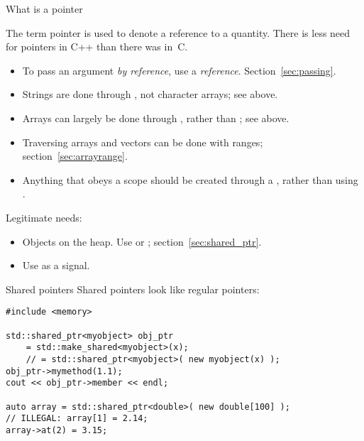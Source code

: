 
 {What is a pointer}

The term pointer is used to denote a reference to a quantity.
There is less need for pointers in C++ than there was in~C.

\begin{itemize}
\item To pass an argument
  \emph{by reference},
  use a \emph{reference}.
  Section~\ref{sec:passing}.
\item Strings are done through , not character arrays;
  see above.
\item Arrays can largely be done through , rather than
  ; see above.
\item Traversing arrays and vectors can be done with ranges;
  section~\ref{sec:arrayrange}.
\item Anything that obeys a scope should be created through a
  , rather than using .
\end{itemize}

Legitimate needs:
\begin{itemize}
\item Objects on the heap. Use  or
  ; section~\ref{sec:shared_ptr}.
\item Use  as a signal.
\end{itemize}

\begin{block}{Shared pointers}
  \label{sl:shared-ptr}
Shared pointers look like regular pointers:
\begin{verbatim}
#include <memory>

std::shared_ptr<myobject> obj_ptr
    = std::make_shared<myobject>(x);
    // = std::shared_ptr<myobject>( new myobject(x) );
obj_ptr->mymethod(1.1);
cout << obj_ptr->member << endl;

auto array = std::shared_ptr<double>( new double[100] );
// ILLEGAL: array[1] = 2.14;
array->at(2) = 3.15;
\end{verbatim}
\end{block}

